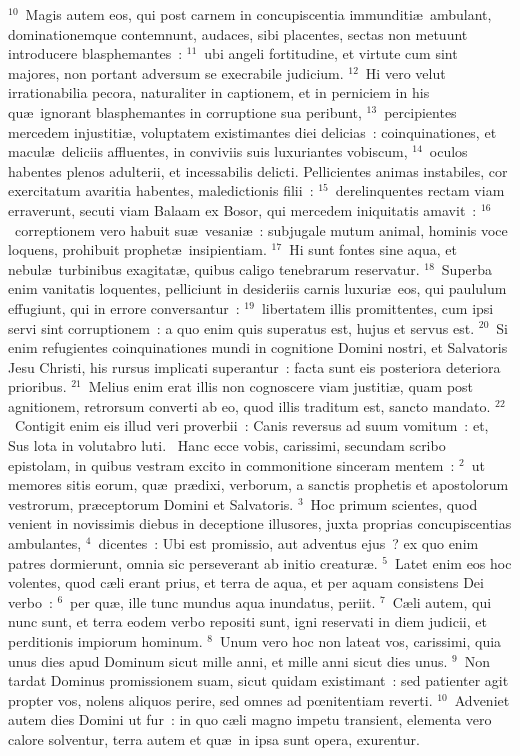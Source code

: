 ${}^{10}$~Magis autem eos, qui post carnem in concupiscentia immunditi\ae\ ambulant, dominationemque contemnunt, audaces, sibi placentes, sectas non metuunt introducere blasphemantes~:
${}^{11}$~ubi angeli fortitudine, et virtute cum sint majores, non portant adversum se execrabile judicium.
${}^{12}$~Hi vero velut irrationabilia pecora, naturaliter in captionem, et in perniciem in his qu\ae\ ignorant blasphemantes in corruptione sua peribunt,
${}^{13}$~percipientes mercedem injustiti\ae , voluptatem existimantes diei delicias~: coinquinationes, et macul\ae\ deliciis affluentes, in conviviis suis luxuriantes vobiscum,
${}^{14}$~oculos habentes plenos adulterii, et incessabilis delicti. Pellicientes animas instabiles, cor exercitatum avaritia habentes, maledictionis filii~:
${}^{15}$~derelinquentes rectam viam erraverunt, secuti viam Balaam ex Bosor, qui mercedem iniquitatis amavit~:
${}^{16}$~correptionem vero habuit su\ae\ vesani\ae~: subjugale mutum animal, hominis voce loquens, prohibuit prophet\ae\ insipientiam.
${}^{17}$~Hi sunt fontes sine aqua, et nebul\ae\ turbinibus exagitat\ae , quibus caligo tenebrarum reservatur.
${}^{18}$~Superba enim vanitatis loquentes, pelliciunt in desideriis carnis luxuri\ae\ eos, qui paululum effugiunt, qui in errore conversantur~:
${}^{19}$~libertatem illis promittentes, cum ipsi servi sint corruptionem~: a quo enim quis superatus est, hujus et servus est.
${}^{20}$~Si enim refugientes coinquinationes mundi in cognitione Domini nostri, et Salvatoris Jesu Christi, his rursus implicati superantur~: facta sunt eis posteriora deteriora prioribus.
${}^{21}$~Melius enim erat illis non cognoscere viam justiti\ae , quam post agnitionem, retrorsum converti ab eo, quod illis traditum est, sancto mandato.
${}^{22}$~Contigit enim eis illud veri proverbii~: Canis reversus ad suum vomitum~: et, Sus lota in volutabro luti.
~\lettrine[lines=10,image=true,loversize=0.05,lraise=-0.03]{H}{}anc ecce vobis, carissimi, secundam scribo epistolam, in quibus vestram excito in commonitione sinceram mentem~:
${}^{2}$~ut memores sitis eorum, qu\ae\ pr\ae dixi, verborum, a sanctis prophetis et apostolorum vestrorum, pr\ae ceptorum Domini et Salvatoris.
${}^{3}$~Hoc primum scientes, quod venient in novissimis diebus in deceptione illusores, juxta proprias concupiscentias ambulantes,
${}^{4}$~dicentes~: Ubi est promissio, aut adventus ejus~? ex quo enim patres dormierunt, omnia sic perseverant ab initio creatur\ae .
${}^{5}$~Latet enim eos hoc volentes, quod c\ae li erant prius, et terra de aqua, et per aquam consistens Dei verbo~:
${}^{6}$~per qu\ae , ille tunc mundus aqua inundatus, periit.
${}^{7}$~C\ae li autem, qui nunc sunt, et terra eodem verbo repositi sunt, igni reservati in diem judicii, et perditionis impiorum hominum.
${}^{8}$~Unum vero hoc non lateat vos, carissimi, quia unus dies apud Dominum sicut mille anni, et mille anni sicut dies unus.
${}^{9}$~Non tardat Dominus promissionem suam, sicut quidam existimant~: sed patienter agit propter vos, nolens aliquos perire, sed omnes ad pœnitentiam reverti.
${}^{10}$~Adveniet autem dies Domini ut fur~: in quo c\ae li magno impetu transient, elementa vero calore solventur, terra autem et qu\ae\ in ipsa sunt opera, exurentur.


